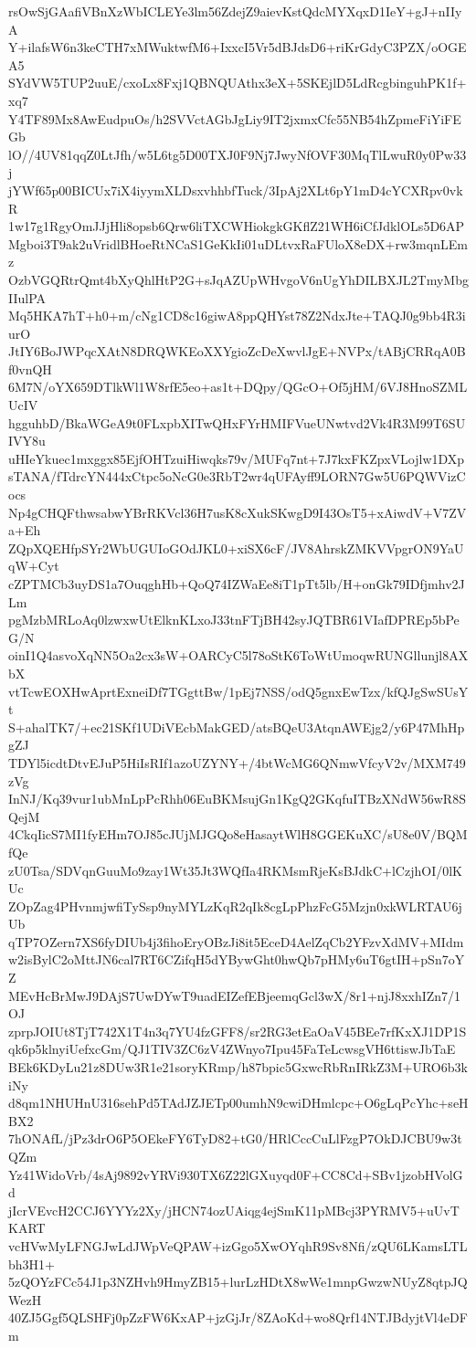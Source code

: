 rsOwSjGAafiVBnXzWbICLEYe3lm56ZdejZ9aievKstQdcMYXqxD1IeY+gJ+nIIyA
Y+ilafsW6n3keCTH7xMWuktwfM6+IxxcI5Vr5dBJdsD6+riKrGdyC3PZX/oOGEA5
SYdVW5TUP2uuE/cxoLx8Fxj1QBNQUAthx3eX+5SKEjlD5LdRcgbinguhPK1f+xq7
Y4TF89Mx8AwEudpuOs/h2SVVctAGbJgLiy9IT2jxmxCfc55NB54hZpmeFiYiFEGb
lO//4UV81qqZ0LtJfh/w5L6tg5D00TXJ0F9Nj7JwyNfOVF30MqTlLwuR0y0Pw33j
jYWf65p00BICUx7iX4iyymXLDsxvhhbfTuck/3IpAj2XLt6pY1mD4cYCXRpv0vkR
1w17g1RgyOmJJjHli8opsb6Qrw6liTXCWHiokgkGKflZ21WH6iCfJdklOLs5D6AP
Mgboi3T9ak2uVridlBHoeRtNCaS1GeKkIi01uDLtvxRaFUloX8eDX+rw3mqnLEmz
OzbVGQRtrQmt4bXyQhlHtP2G+sJqAZUpWHvgoV6nUgYhDILBXJL2TmyMbgIIulPA
Mq5HKA7hT+h0+m/cNg1CD8c16giwA8ppQHYst78Z2NdxJte+TAQJ0g9bb4R3iurO
JtIY6BoJWPqcXAtN8DRQWKEoXXYgioZcDeXwvlJgE+NVPx/tABjCRRqA0Bf0vnQH
6M7N/oYX659DTlkWl1W8rfE5eo+as1t+DQpy/QGcO+Of5jHM/6VJ8HnoSZMLUcIV
hgguhbD/BkaWGeA9t0FLxpbXITwQHxFYrHMIFVueUNwtvd2Vk4R3M99T6SUIVY8u
uHIeYkuec1mxggx85EjfOHTzuiHiwqks79v/MUFq7nt+7J7kxFKZpxVLojlw1DXp
sTANA/fTdrcYN444xCtpc5oNcG0e3RbT2wr4qUFAyff9LORN7Gw5U6PQWVizCocs
Np4gCHQFthwsabwYBrRKVcl36H7usK8cXukSKwgD9I43OsT5+xAiwdV+V7ZVa+Eh
ZQpXQEHfpSYr2WbUGUIoGOdJKL0+xiSX6cF/JV8AhrskZMKVVpgrON9YaUqW+Cyt
cZPTMCb3uyDS1a7OuqghHb+QoQ74IZWaEe8iT1pTt5lb/H+onGk79IDfjmhv2JLm
pgMzbMRLoAq0lzwxwUtElknKLxoJ33tnFTjBH42syJQTBR61VIafDPREp5bPeG/N
oinI1Q4asvoXqNN5Oa2cx3sW+OARCyC5l78oStK6ToWtUmoqwRUNGllunjl8AXbX
vtTcwEOXHwAprtExneiDf7TGgttBw/1pEj7NSS/odQ5gnxEwTzx/kfQJgSwSUsYt
S+ahalTK7/+ec21SKf1UDiVEcbMakGED/atsBQeU3AtqnAWEjg2/y6P47MhHpgZJ
TDYl5icdtDtvEJuP5HiIsRIf1azoUZYNY+/4btWcMG6QNmwVfcyV2v/MXM749zVg
InNJ/Kq39vur1ubMnLpPcRhh06EuBKMsujGn1KgQ2GKqfuITBzXNdW56wR8SQejM
4CkqIicS7MI1fyEHm7OJ85cJUjMJGQo8eHasaytWlH8GGEKuXC/sU8e0V/BQMfQe
zU0Tsa/SDVqnGuuMo9zay1Wt35Jt3WQfIa4RKMsmRjeKsBJdkC+lCzjhOI/0lKUc
ZOpZag4PHvnmjwfiTySsp9nyMYLzKqR2qIk8cgLpPhzFcG5Mzjn0xkWLRTAU6jUb
qTP7OZern7XS6fyDIUb4j3fihoEryOBzJi8it5EceD4AelZqCb2YFzvXdMV+MIdm
w2isBylC2oMttJN6cal7RT6CZifqH5dYBywGht0hwQb7pHMy6uT6gtIH+pSn7oYZ
MEvHcBrMwJ9DAjS7UwDYwT9uadEIZefEBjeemqGcl3wX/8r1+njJ8xxhIZn7/1OJ
zprpJOIUt8TjT742X1T4n3q7YU4fzGFF8/sr2RG3etEaOaV45BEe7rfKxXJ1DP1S
qk6p5klnyiUefxcGm/QJ1TIV3ZC6zV4ZWnyo7Ipu45FaTeLcwsgVH6ttiswJbTaE
BEk6KDyLu21z8DUw3R1e21soryKRmp/h87bpic5GxwcRbRnIRkZ3M+URO6b3kiNy
d8qm1NHUHnU316sehPd5TAdJZJETp00umhN9cwiDHmlcpc+O6gLqPcYhc+seHBX2
7hONAfL/jPz3drO6P5OEkeFY6TyD82+tG0/HRlCccCuLlFzgP7OkDJCBU9w3tQZm
Yz41WidoVrb/4sAj9892vYRVi930TX6Z22lGXuyqd0F+CC8Cd+SBv1jzobHVolGd
jIcrVEvcH2CCJ6YYYz2Xy/jHCN74ozUAiqg4ejSmK11pMBcj3PYRMV5+uUvTKART
vcHVwMyLFNGJwLdJWpVeQPAW+izGgo5XwOYqhR9Sv8Nfi/zQU6LKamsLTLbh3H1+
5zQOYzFCc54J1p3NZHvh9HmyZB15+lurLzHDtX8wWe1mnpGwzwNUyZ8qtpJQWezH
40ZJ5Ggf5QLSHFj0pZzFW6KxAP+jzGjJr/8ZAoKd+wo8Qrf14NTJBdyjtVl4eDFm
